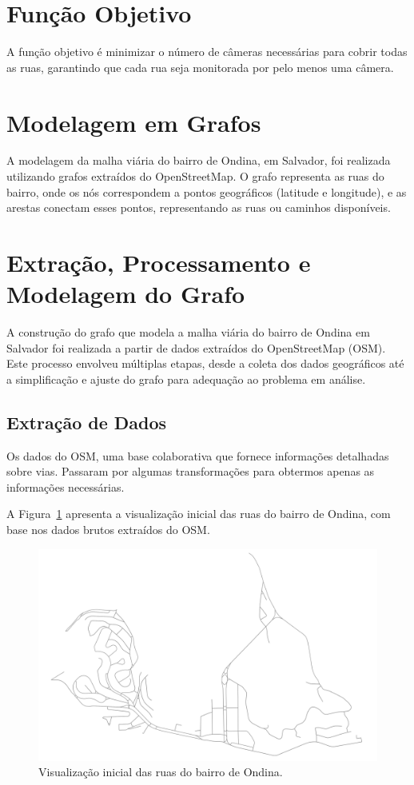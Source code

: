 \documentclass[12pt, a4paper]{report}
\begin{document}
\section{Função Objetivo}
A função objetivo é minimizar o número de câmeras necessárias para cobrir todas as ruas, garantindo que cada rua seja monitorada por pelo menos uma câmera.

\section{Modelagem em Grafos}

A modelagem da malha viária do bairro de Ondina, em Salvador, foi realizada utilizando grafos extraídos do OpenStreetMap. O grafo representa as ruas do bairro, onde os nós correspondem a pontos geográficos (latitude e longitude), e as arestas conectam esses pontos, representando as ruas ou caminhos disponíveis.

\section{Extração, Processamento e Modelagem do Grafo}

A construção do grafo que modela a malha viária do bairro de Ondina em Salvador foi realizada a partir de dados extraídos do OpenStreetMap (OSM). Este processo envolveu múltiplas etapas, desde a coleta dos dados geográficos até a simplificação e ajuste do grafo para adequação ao problema em análise.

\subsection{Extração de Dados}

Os dados do OSM, uma base colaborativa que fornece informações detalhadas sobre vias. Passaram por algumas transformações para obtermos apenas as informações necessárias.

A Figura~\ref{fig:ondina_ruas} apresenta a visualização inicial das ruas do bairro de Ondina, com base nos dados brutos extraídos do OSM.

\begin{figure}[H]
    \centering
    \includegraphics[width=\textwidth]{visualizacao_inicial}
    \caption{Visualização inicial das ruas do bairro de Ondina.}
    \label{fig:ondina_ruas}
\end{figure}
\end{document}

